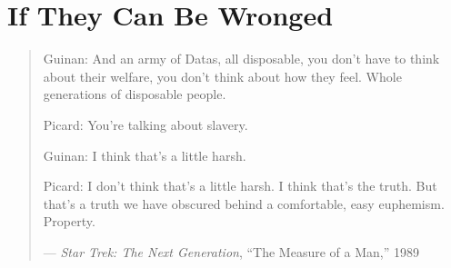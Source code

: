 \part{If They Can Be Wronged}
\begin{quote}
Guinan: And an army of Datas, all disposable, you don't have to think about their welfare, you don't think about how they feel. Whole generations of disposable people.

Picard: You're talking about slavery.

Guinan: I think that's a little harsh.

Picard: I don't think that's a little harsh. I think that's the truth. But that's a truth we have obscured behind a comfortable, easy euphemism. Property.

— \emph{Star Trek: The Next Generation}, “The Measure of a Man,” 1989 \autocite{snodgrass1989measure}
\end{quote}
